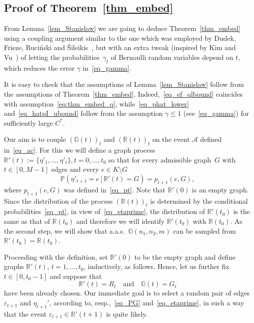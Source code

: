 \documentclass[12pt,reqno]{amsart}
\newcommand{\ac}{{\mathcal{A}}}
\newcommand{\Prob} {\mathbb {P}}
\newcommand{\prob}[1]{\Prob\left(#1\right)}
\newcommand{\Pc}[2]{\prob{#1\,|\,#2}}
\newcommand{\eps} {\varepsilon}
\newcommand{\R} {\mathbb R}
\newcommand{\G} {\mathbb G}
\newcommand{\Gnnm} {\G(n_1,n_2,m)}
\theoremstyle{definition}
\begin{document}
\medskip



\subsection{Proof of Theorem~\ref{thm_embed}}
\label{ss_proof_embed}

From Lemma~\ref{lem_Stanislaw} we are going to deduce Theorem~\ref{thm_embed} using a coupling argument similar to the one which was employed by Dudek, Frieze, Ruci\'nski and \v{S}ileikis~\cite{DFRSc}, but with an extra tweak (inspired by Kim and Vu~\cite{KV04}) of letting the probabilities~$\gamma_t$ of Bernoulli random variables depend on $t$, which reduces the error $\gamma$ in~\eqref{eq_gamma}.

It is easy to check that the assumptions of Lemma~\ref{lem_Stanislaw} follow from the assumptions of Theorem~\ref{thm_embed}. Indeed,~\eqref{eq_ef_qlbound} coincides with assumption~\eqref{eq:thm_embed_q}, while~\eqref{eq_phat_lower} and~\eqref{eq_hatpI_ubound} follow from the assumption $\gamma \le 1$ (see~\eqref{eq_gamma}) for sufficiently large $C^*$.

\medskip

Our aim is to couple $(\G(t))_t$ and $(\R(t))_t$ on the event $\ac$ defined in~\eqref{eq_ac}. For this we will define a graph process $\R'(t) := \{\eta'_1, \dots, \eta'_t\}, t = 0, \dots, t_0$ so that for every admissible graph~$G$ with $t \in [0, M -1]$ edges and every $e \in K \setminus G$
\begin{equation}\label{eq_etaprime}
    \Pc{\eta'_{t+1} = e}{\R'(t) = G} = p_{t+1}(e, G),
\end{equation}
where $p_{t+1}(e, G)$ was defined in~\eqref{eq_pt}.
Note that $\R'(0)$ is an empty graph. Since the distribution of the process $(\R(t))_t$ is determined by the conditional probabilities~\eqref{eq_pt}, in view of~\eqref{eq_etaprime}, the distribution of $\R'(t_0)$ is the same as that of $\R(t_0)$ and therefore we will identify $\R'(t_0)$ with $\R(t_0)$. As the second step, we will show
that a.a.s.\ $\Gnnm$ can be sampled from $\R'(t_0) = \R(t_0)$.

Proceeding with the definition, set $\R'(0)$ to be the empty graph and define graphs $\R'(t)$, $t = 1, \dots, t_0$, inductively, as follows. %
Hence, let us further
fix $t \in [0, t_0-1]$ and suppose that
\[
  \R'(t)=R_t\quad\mbox{and}\quad \G(t)=G_t
\]
have been already chosen.
Our immediate goal is to select  a random pair of edges $\eps_{t+1}$ and $\eta_{t+1}'$, according to, resp.,~\eqref{eq_PG} and~\eqref{eq_etaprime}, in such a way that the event $\eps_{t+1}\in \R'(t+1)$ is quite likely.
\end{document}
